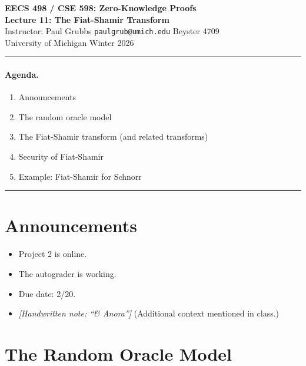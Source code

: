 \documentclass[11pt]{article}
\begin{document}

\begin{center}
  {\Large \textbf{EECS 498 / CSE 598: Zero-Knowledge Proofs}} \\[4pt]
  {\large \textbf{Lecture 11: The Fiat-Shamir Transform}} \\[4pt]
  {\normalsize Instructor: Paul Grubbs \quad
   \texttt{paulgrub@umich.edu} \quad Beyster 4709} \\[2pt]
  {\normalsize University of Michigan \quad Winter 2026}
\end{center}

\medskip
\hrule
\medskip

\paragraph{Agenda.}
\begin{enumerate}[label=(\arabic*)]
  \item Announcements
  \item The random oracle model
  \item The Fiat-Shamir transform (and related transforms)
  \item Security of Fiat-Shamir
  \item Example: Fiat-Shamir for Schnorr
\end{enumerate}

\medskip
\hrule
\bigskip

\section{Announcements}

\begin{itemize}
  \item Project 2 is online.
  \item The autograder is working.
  \item Due date: 2/20.
  \item \textit{[Handwritten note: ``\& Anora'']} \quad
        (Additional context mentioned in class.)
\end{itemize}

\section{The Random Oracle Model}
\end{document}
